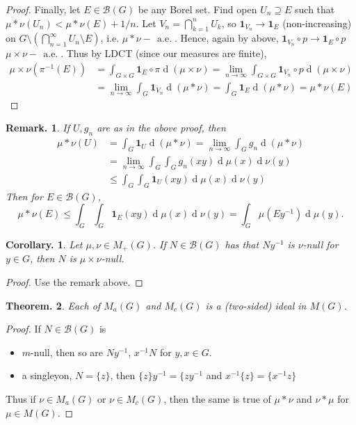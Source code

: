 \documentclass[11pt, a4paper]{memoir}
\theoremstyle{change}
\newtheorem{theorem}{Theorem.}[section]
\newtheorem{corollary}[theorem]{Corollary.}
\theoremstyle{plain}
\theoremstyle{nonumberplain}
\newtheorem{remark}{Remark.}
\newtheorem{proof}{Proof}
\renewcommand{\d}[1]{\ensuremath{\operatorname{d}\!{#1}}}
\newcommand{\mae}{\ensuremath{\,\operatorname{a.e.}}}
\newcommand{\idc}[1]{\ensuremath{\mathbf{1}_{#1}}}
\numberwithin{equation}{section}
\begin{document}
\begin{proof}
    Finally, let $E\in\mathcal{B}(G)$ be any Borel set.
    Find open $U_n\supseteq E$ such that $\mu*\nu(U_n)<\mu*\nu(E)+1/n$.
    Let $V_n=\bigcap_{k=1}^n U_k$, so $\idc{V_n}\to\idc{E}$ (non-increasing) on $G\setminus\left(\bigcap_{n=1}^\infty U_n\setminus E\right)$, i.e. $\mu*\nu-\mae$.
    Hence, again by above, $\idc{V_n}\circ p\to\idc{E}\circ p$ $\mu\times\nu-\mae$.
    Thus by LDCT (since our measures are finite),
    \begin{align*}
        \mu\times\nu(\pi^{-1}(E))&=\int_{G\times G}\idc{E}\circ\pi\d{(\mu\times\nu)} = \lim_{n\to\infty}\int_{G\times G}\idc{V_n}\circ p\d{(\mu\times\nu)}\\
                                 &= \lim_{n\to\infty}\int_G\idc{V_n}\d{(\mu*\nu)} = \int_G\idc{E}\d{(\mu*\nu)}=\mu*\nu(E)
    \end{align*}
\end{proof}
\begin{remark}
    If $U,g_n$ are as in the above proof, then
    \begin{align*}
        \mu*\nu(U)&=\int_G\idc{U}\d{(\mu*\nu)}=\lim_{n\to\infty}\int_G g_n\d{(\mu*\nu)}\\
                  &= \lim_{n\to\infty}\int_G\int_G g_n(xy)\d{\mu(x)}\d{\nu(y)}\\
                  &\leq \int_G\int_G \idc{U}(xy)\d{\mu(x)}\d{\nu(y)}
    \end{align*}
    Then for $E\in\mathcal{B}(G)$,
    \begin{equation*}
        \mu*\nu(E)\leq\int_G\int_G\idc{E}(xy)\d{\mu(x)}\d{\nu(y)}=\int_G\mu(Ey^{-1})\d{\mu(y)}.
    \end{equation*}
\end{remark}
\begin{corollary}
    Let $\mu,\nu\in M_+(G)$.
    If $N\in\mathcal{B}(G)$ has that $Ny^{-1}$ is $\nu$-null for $y\in G$, then $N$ is $\mu\times\nu$-null.
\end{corollary}
\begin{proof}
    Use the remark above.
\end{proof}
\begin{theorem}
    Each of $M_a(G)$ and $M_c(G)$ is a (two-sided) ideal in $M(G)$.
\end{theorem}
\begin{proof}
    If $N\in\mathcal{B}(G)$ is
    \begin{itemize}[nl]
        \item $m$-null, then so are $Ny^{-1}$, $x^{-1}N$ for $y,x\in G$.
        \item a singleyon, $N=\{z\}$, then $\{z\}y^{-1}=\{zy^{-1}$ and $x^{-1}\{z\}=\{x^{-1}z\}$
    \end{itemize}
    Thus if $\nu\in M_a(G)$ or $\nu\in M_c(G)$, then the same is true of $\mu*\nu$ and $\nu*\mu$ for $\mu\in M(G)$.
\end{proof}
\end{document}
